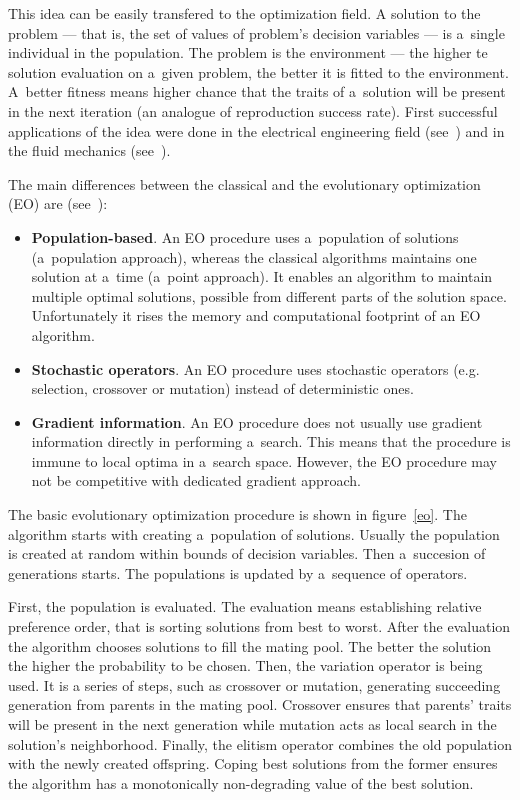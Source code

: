 This idea can be easily transfered to the optimization field. A solution to
the problem --- that is, the set of values of problem's decision variables ---
is a~single individual in the population. The problem is the environment ---
the higher te solution evaluation on a~given problem, the better it is fitted
to the environment. A~better fitness means higher chance that the traits of
a~solution will be present in the next iteration (an analogue of reproduction
success rate). First successful applications of the idea were done in the
electrical engineering field (see~\cite{Fog64}) and in the fluid mechanics
(see~\cite{Rec65, Sch65}).

The main differences between the classical and the evolutionary optimization
(EO) are (see~\cite{Deb08}):

\begin{itemize}
\item \textbf{Population-based}. An EO procedure uses a~population of
  solutions (a~population approach), whereas the classical algorithms
  maintains one solution at a~time (a~point approach). It enables an algorithm
  to maintain multiple optimal solutions, possible from different parts of the
  solution space. Unfortunately it rises the memory and computational
  footprint of an EO algorithm.
\item \textbf{Stochastic operators}. An EO procedure uses stochastic operators
  (e.g. selection, crossover or mutation) instead of deterministic ones.
\item \textbf{Gradient information}. An EO procedure does not usually use
  gradient information directly in performing a~search. This means that the
  procedure is immune to local optima in a~search space. However, the EO
  procedure may not be competitive with dedicated gradient approach.
\end{itemize}

The basic evolutionary optimization procedure is shown in figure~\ref{eo}. The
algorithm starts with creating a~population of solutions. Usually the
population is created at random within bounds of decision variables. Then
a~succesion of generations starts. The populations is updated by a~sequence of
operators.

First, the population is evaluated. The evaluation means establishing relative
preference order, that is sorting solutions from best to worst. After the
evaluation the algorithm chooses solutions to fill the mating pool. The better
the solution the higher the probability to be chosen. Then, the variation
operator is being used. It is a series of steps, such as crossover or
mutation, generating succeeding generation from parents in the mating
pool. Crossover ensures that parents' traits will be present in the next
generation while mutation acts as local search in the solution's
neighborhood. Finally, the elitism operator combines the old population with
the newly created offspring. Coping best solutions from the former ensures the
algorithm has a monotonically non-degrading value of the best solution.

